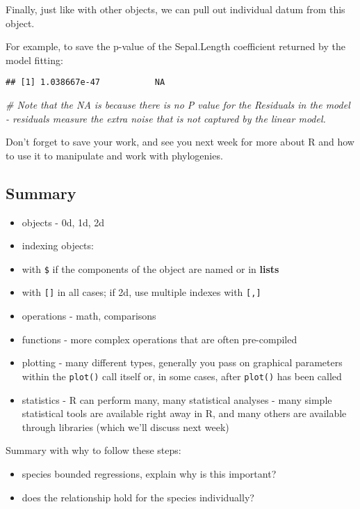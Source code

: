 \documentclass[]{article}
\newenvironment{Shaded}{\begin{snugshade}}{\end{snugshade}}
\newcommand{\DataTypeTok}[1]{\textcolor[rgb]{0.13,0.29,0.53}{#1}}
\newcommand{\StringTok}[1]{\textcolor[rgb]{0.31,0.60,0.02}{#1}}
\newcommand{\CommentTok}[1]{\textcolor[rgb]{0.56,0.35,0.01}{\textit{#1}}}
\newcommand{\OperatorTok}[1]{\textcolor[rgb]{0.81,0.36,0.00}{\textbf{#1}}}
\newcommand{\NormalTok}[1]{#1}
\providecommand{\tightlist}{%
  \setlength{\itemsep}{0pt}\setlength{\parskip}{0pt}}
\begin{document}
Finally, just like with other objects, we can pull out individual datum
from this object.

For example, to save the p-value of the Sepal.Length coefficient
returned by the model fitting:

\begin{Shaded}
\end{Shaded}

\begin{verbatim}
## [1] 1.038667e-47           NA
\end{verbatim}

\begin{Shaded}
\begin{Highlighting}[]
\CommentTok{# Note that the NA is because there is no P value for the Residuals in the model - residuals measure the extra noise that is not captured by the linear model.}
\end{Highlighting}
\end{Shaded}

Don't forget to save your work, and see you next week for more about R
and how to use it to manipulate and work with phylogenies.

\subsection{Summary}\label{summary}

\begin{itemize}
\tightlist
\item
  objects - 0d, 1d, 2d
\item
  indexing objects:
\item
  with \texttt{\$} if the components of the object are named or in
  \textbf{lists}
\item
  with \texttt{{[}{]}} in all cases; if 2d, use multiple indexes with
  \texttt{{[},{]}}
\item
  operations - math, comparisons
\item
  functions - more complex operations that are often pre-compiled
\item
  plotting - many different types, generally you pass on graphical
  parameters within the \texttt{plot()} call itself or, in some cases,
  after \texttt{plot()} has been called
\item
  statistics - R can perform many, many statistical analyses - many
  simple statistical tools are available right away in R, and many
  others are available through libraries (which we'll discuss next week)
\end{itemize}

Summary with why to follow these steps:

\begin{itemize}
\tightlist
\item
  species bounded regressions, explain why is this important?
\item
  does the relationship hold for the species individually?
\end{itemize}
\end{document}
